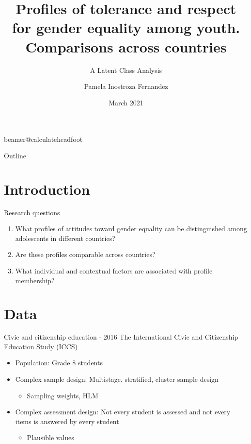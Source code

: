 \documentclass[11pt,t]{beamer}
\title[]{Profiles of tolerance and respect for gender equality among youth. Comparisons
  across countries} %
\subtitle{A Latent Class Analysis}
\author{Pamela Inostroza Fernandez}
\institute{KU Leuven}
\date{March 2021}
\begin{document}
\csname beamer@calculateheadfoot\endcsname %


\begin{frame}
	\titlepage
\end{frame}
	

\begin{frame}{Outline}
	\hfill	{\large \parbox{.961\textwidth}{\tableofcontents[hideothersubsections]}}
\end{frame}

\section{Introduction}
\begin{frame}[c,plain]{Research questions}

\begin{enumerate}
\item What profiles of  attitudes toward gender equality can be distinguished among adolescents in different countries?
\item Are these profiles comparable across countries?
\item What individual and contextual factors are associated with profile membership? 
\end{enumerate}	
		
\end{frame}


\section{Data}
\begin{frame}{Civic and citizenship education - 2016}
The International Civic and Citizenship Education Study (ICCS)

\begin{itemize}
	\item Population: 
	Grade 8 students

	\item Complex sample design:
	Multistage, stratified, cluster sample design 
	\begin{itemize}
		\item	Sampling weights, HLM
	\end{itemize}

	\item Complex assessment design:
	Not every student is assessed and not every items is answered by every student 
	\begin{itemize}
		\item Plausible values
	\end{itemize}
\end{itemize}
\end{frame}
\end{document}
